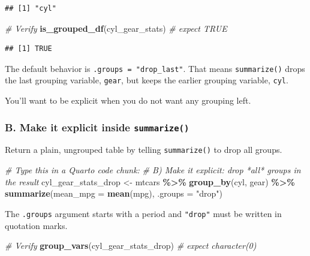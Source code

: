 \documentclass[
]{article}
\newenvironment{Shaded}{\begin{snugshade}}{\end{snugshade}}
\newcommand{\AttributeTok}[1]{\textcolor[rgb]{0.13,0.29,0.53}{#1}}
\newcommand{\CommentTok}[1]{\textcolor[rgb]{0.56,0.35,0.01}{\textit{#1}}}
\newcommand{\FunctionTok}[1]{\textcolor[rgb]{0.13,0.29,0.53}{\textbf{#1}}}
\newcommand{\NormalTok}[1]{#1}
\newcommand{\OtherTok}[1]{\textcolor[rgb]{0.56,0.35,0.01}{#1}}
\newcommand{\SpecialCharTok}[1]{\textcolor[rgb]{0.81,0.36,0.00}{\textbf{#1}}}
\newcommand{\StringTok}[1]{\textcolor[rgb]{0.31,0.60,0.02}{#1}}
\begin{document}
\begin{verbatim}
## [1] "cyl"
\end{verbatim}

\begin{Shaded}
\begin{Highlighting}[]
\CommentTok{\#  Verify}
\FunctionTok{is\_grouped\_df}\NormalTok{(cyl\_gear\_stats) }\CommentTok{\# expect TRUE}
\end{Highlighting}
\end{Shaded}

\begin{verbatim}
## [1] TRUE
\end{verbatim}

The default behavior is \texttt{.groups\ =\ "drop\_last"}. That means
\texttt{summarize()} drops the last grouping variable, \texttt{gear},
but keeps the earlier grouping variable, \texttt{cyl}.

You'll want to be explicit when you do not want any grouping left.

\subsubsection{\texorpdfstring{B. Make it explicit inside
\texttt{summarize()}}{B. Make it explicit inside summarize()}}\label{b.-make-it-explicit-inside-summarize}

Return a plain, ungrouped table by telling \texttt{summarize()} to drop
all groups.

\begin{Shaded}
\begin{Highlighting}[]
\CommentTok{\#  Type this in a Quarto code chunk:}
\CommentTok{\# B) Make it explicit: drop *all* groups in the result}
\NormalTok{cyl\_gear\_stats\_drop }\OtherTok{\textless{}{-}}\NormalTok{ mtcars }\SpecialCharTok{\%\textgreater{}\%}
  \FunctionTok{group\_by}\NormalTok{(cyl, gear) }\SpecialCharTok{\%\textgreater{}\%}
  \FunctionTok{summarize}\NormalTok{(}\AttributeTok{mean\_mpg =} \FunctionTok{mean}\NormalTok{(mpg), }\AttributeTok{.groups =} \StringTok{"drop"}\NormalTok{)}
\end{Highlighting}
\end{Shaded}

The \texttt{.groups} argument starts with a period and \texttt{"drop"}
must be written in quotation marks.

\begin{Shaded}
\begin{Highlighting}[]
\CommentTok{\#  Verify}
\FunctionTok{group\_vars}\NormalTok{(cyl\_gear\_stats\_drop)  }\CommentTok{\# expect character(0)}
\end{Highlighting}
\end{Shaded}
\end{document}
